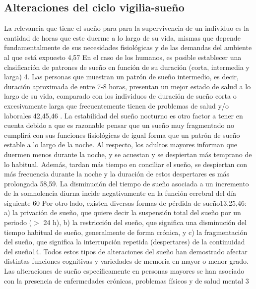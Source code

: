 
\subsection{Alteraciones del ciclo vigilia-sueño}

La relevancia que tiene el sueño para para la supervivencia de un individuo es la cantidad de horas que este duerme a lo largo de su vida, mismas que depende fundamentalmente de sus necesidades fisiológicas y de las demandas del ambiente al que está expuesto 4,57
 En el caso de los humanos, es posible establecer una clasificación de patrones de sueño en función de su duración (corta, intermedia y larga) 4. Las personas que muestran un patrón de sueño intermedio, es decir, duración aproximada de entre 7-8 horas, presentan un mejor estado de salud a lo largo de su vida, comparado con los individuos de duración de sueño corta o excesivamente larga que frecuentemente tienen de problemas de salud y/o laborales 42,45,46 . 
La estabilidad del sueño nocturno es otro factor a tener en cuenta debido a que es razonable pensar que un sueño muy fragmentado no cumplirá con sus funciones fisiológicas de igual forma que un patrón de sueño estable a lo largo de la noche. Al respecto, los adultos mayores informan que duermen menos durante la noche, y se acuestan y se despiertan más temprano de lo habitual. Además, tardan más tiempo en conciliar el sueño, se despiertan con más frecuencia durante la noche y la duración de estos despertares es más prolongada 58,59.
La disminución del tiempo de sueño asociada a un incremento de la somnolencia diurna incide negativamente en la función cerebral del día siguiente 60
Por otro lado, existen diversas formas de pérdida de sueño13,25,46: a) la privación de sueño, que quiere decir la suspensión total del sueño por un periodo ($>$ 24 h), b) la restricción del sueño, que significa una disminución del tiempo habitual de sueño, generalmente de forma crónica, y c) la fragmentación del sueño, que significa la interrupción repetida (despertares) de la continuidad del sueño14. Todos estos tipos de alteraciones del sueño han demostrado afectar distintas funciones cognitivas y variedades de memoria en mayor o menor grado.
Las alteraciones de sueño específicamente en personas mayores se han asociado con la presencia de enfermedades crónicas, problemas físicos y de salud mental 3



